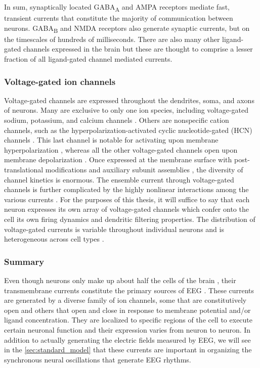 In sum, synaptically located GABA\textsubscript{A} and AMPA receptors mediate fast, transient currents that constitute the majority of communication between neurons. GABA\textsubscript{B} and NMDA receptors also generate synaptic currents, but on the timescales of hundreds of milliseconds. There are also many other ligand-gated channels expressed in the brain but these are thought to comprise a lesser fraction of all ligand-gated channel mediated currents.

\subsubsection{Voltage-gated ion channels} \label{sec:I_V}
Voltage-gated channels are expressed throughout the dendrites, soma, and axons of neurons. Many are exclusive to only one ion species, including voltage-gated sodium, potassium, and calcium channels \cite{hille1992ionic}. Others are nonspecific cation channels, such as the hyperpolarization-activated cyclic nucleotide-gated (HCN) channels \cite{He2014}. This last channel is notable for activating upon membrane hyperpolarization \cite{He2014}, whereas all the other voltage-gated channels open upon membrane depolarization \cite{hille1992ionic}. Once expressed at the membrane surface with post-translational modifications \cite{Schulz2008} and auxiliary subunit assemblies \cite{Isom1994}, the diversity of channel kinetics is enormous. The ensemble current through voltage-gated channels is further complicated by the highly nonlinear interactions among the various currents \cite{Izhikevich2006}. For the purposes of this thesis, it will suffice to say that each neuron expresses its own array of voltage-gated channels which confer onto the cell its own firing dynamics and dendritic filtering properties. The distribution of voltage-gated currents is variable throughout individual neurons \cite{Lai2006} and is heterogeneous across cell types \cite{Berg2021,Scala2021}.

\subsubsection{Summary}
Even though neurons only make up about half the cells of the brain \cite{Azevedo2009}, their transmembrane currents constitute the primary sources of EEG \cite{Buzsaki2012}. These currents are generated by a diverse family of ion channels, some that are constitutively open and others that open and close in response to membrane potential and/or ligand concentration. They are localized to specific regions of the cell to execute certain neuronal function and their expression varies from neuron to neuron. In addition to actually generating the electric fields measured by EEG, we will see in the \autoref{sec:standard_model} that these currents are important in organizing the synchronous neural oscillations that generate EEG rhythms.

